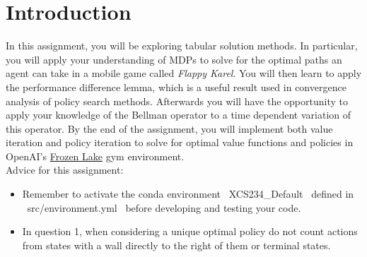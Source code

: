 \section{Introduction}

In this assignment, you will be exploring tabular solution methods. In particular, you will apply your understanding of MDPs to solve for the optimal paths an agent can take in a mobile game called \textit{Flappy Karel}. You will then learn to apply the performance difference lemma, which is a useful result used in convergence analysis of policy search methods. Afterwards you will have the opportunity to apply your knowledge of the Bellman operator to a time dependent variation of this operator. By the end of the assignment, you will implement both value iteration and policy iteration to solve for optimal value functions and policies in OpenAI's \href{https://www.gymlibrary.dev/environments/toy_text/frozen_lake/}{Frozen Lake} gym environment. \\

Advice for this assignment:
\begin{itemize}
  \item Remember to activate the conda environment ~XCS234_Default~ defined in  ~src/environment.yml~ before developing and testing your code.

  \item In question 1, when considering a unique optimal policy do not count actions from states with a wall directly to the right of them or terminal states.
\end{itemize}
